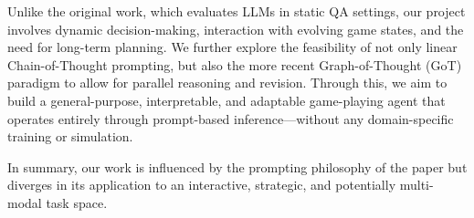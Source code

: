 \documentclass{article}
\begin{document}
Unlike the original work, which evaluates LLMs in static QA settings, our project involves dynamic decision-making, interaction with evolving game states, and the need for long-term planning. We further explore the feasibility of not only linear Chain-of-Thought prompting, but also the more recent Graph-of-Thought (GoT) paradigm to allow for parallel reasoning and revision. Through this, we aim to build a general-purpose, interpretable, and adaptable game-playing agent that operates entirely through prompt-based inference—without any domain-specific training or simulation.

In summary, our work is influenced by the prompting philosophy of the paper but diverges in its application to an interactive, strategic, and potentially multi-modal task space.
\end{document}
